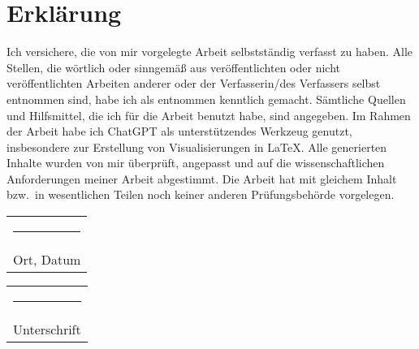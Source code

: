 \chapter*{Erklärung}
%
Ich versichere, die von mir vorgelegte Arbeit selbstständig verfasst zu haben. Alle Stellen, die wörtlich oder sinngemäß aus veröffentlichten oder nicht veröffentlichten Arbeiten anderer oder der Verfasserin/des Verfassers selbst entnommen sind, habe ich als entnommen kenntlich gemacht. Sämtliche Quellen und Hilfsmittel, die ich für die Arbeit benutzt habe, sind angegeben. Im Rahmen der Arbeit habe ich ChatGPT als unterstützendes Werkzeug genutzt, insbesondere zur Erstellung von Visualisierungen in LaTeX. Alle generierten Inhalte wurden von mir überprüft, angepasst und auf die wissenschaftlichen Anforderungen meiner Arbeit abgestimmt. Die Arbeit hat mit gleichem Inhalt bzw.\ in wesentlichen Teilen noch keiner anderen Prüfungsbehörde vorgelegen.
\\[3cm] 
\begin{tabular}{@{}l@{}}%
\rule{0.35\textwidth}{0.4pt}\\
Ort, Datum%
\end{tabular}%
\hfill%
\begin{tabular}{@{}l@{}}%
\rule{0.45\textwidth}{0.4pt}\\
Unterschrift%
\end{tabular}%